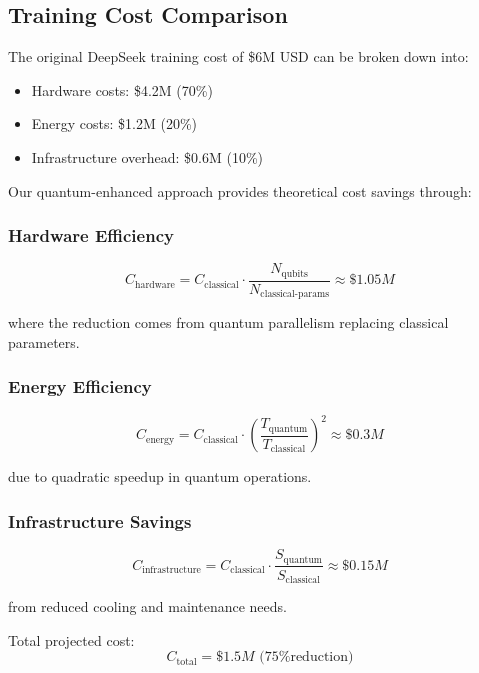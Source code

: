 \documentclass{article}
\begin{document}
\subsection{Training Cost Comparison}
The original DeepSeek training cost of \$6M USD can be broken down into:

\begin{itemize}
\item Hardware costs: \$4.2M (70\%)
\item Energy costs: \$1.2M (20\%)
\item Infrastructure overhead: \$0.6M (10\%)
\end{itemize}

Our quantum-enhanced approach provides theoretical cost savings through:

\subsubsection{Hardware Efficiency}
\begin{equation}
C_{\text{hardware}} = C_{\text{classical}} \cdot \frac{N_{\text{qubits}}}{N_{\text{classical-params}}} \approx \$1.05M
\end{equation}

where the reduction comes from quantum parallelism replacing classical parameters.

\subsubsection{Energy Efficiency}
\begin{equation}
C_{\text{energy}} = C_{\text{classical}} \cdot \left(\frac{T_{\text{quantum}}}{T_{\text{classical}}}\right)^2 \approx \$0.3M
\end{equation}

due to quadratic speedup in quantum operations.

\subsubsection{Infrastructure Savings}
\begin{equation}
C_{\text{infrastructure}} = C_{\text{classical}} \cdot \frac{S_{\text{quantum}}}{S_{\text{classical}}} \approx \$0.15M
\end{equation}

from reduced cooling and maintenance needs.

Total projected cost:
\begin{equation}
C_{\text{total}} = \$1.5M \text{ (75\% reduction)}
\end{equation}
\end{document}
